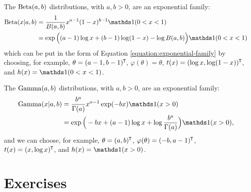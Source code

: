 \documentclass[12pt]{article}
\begin{document}
\begin{example}[Beta]
The $\operatorname*{Beta}(a,b)$ distributions, with $a,b>0$, are an exponential family:
\begin{align*}
\Beta(x|a,b) &= \frac{1}{B(a,b)}x^{a-1}(1-x)^{b-1}\I(0< x < 1)\\
& = \exp\Big((a-1)\log x + (b-1)\log(1-x)-\log B(a,b)\Big)\I(0< x < 1)
\end{align*}
which can be put in the form of Equation \ref{equation:exponential-family} by choosing, for example, $\theta=(a-1,b-1)^{\mathtt{T}}$, $\varphi(\theta) = \theta$, $t(x) = (\log x,\log(1-x))^{\mathtt{T}}$, and $h(x)= \I(0< x < 1)$.
\end{example}

\begin{example}[Gamma]
The $\operatorname*{Gamma}(a,b)$ distributions, with $a,b>0$, are an exponential family:
\begin{align*}
\Ga(x|a,b) & =\frac{b^a}{\Gamma(a)} x^{a-1}\exp(-b x)\I(x>0)\\
& =\exp\Big(-b x +(a-1)\log x +\log\frac{b^a}{\Gamma(a)}\Big)\I(x>0),
\end{align*}
and we can choose, for example, $\theta=(a,b)^{\mathtt{T}}$, $\varphi(\theta) = (-b,a-1)^{\mathtt{T}}$, $t(x) = (x,\log x)^{\mathtt{T}}$, and $h(x)= \I(x>0)$.
\end{example}







\section{Exercises}
\end{document}
